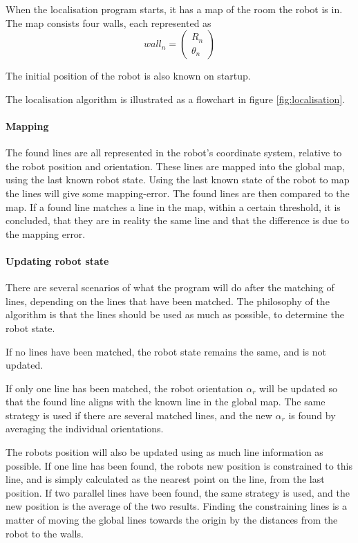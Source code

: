 When the localisation program starts, it has a map of the room the robot is in.
The map consists four walls, each represented as 
$$wall_n = \begin{pmatrix}
R_n\\
\theta_n
\end{pmatrix}
$$

The initial position of the robot is also known on startup.

The localisation algorithm is illustrated as a flowchart in figure \ref{fig:localisation}.

\paragraph*{Mapping}
The found lines are all represented in the robot's coordinate system, relative to the robot position and orientation.
These lines are mapped into the global map, using the last known robot state. Using 
the last known state of the robot to map the lines will give some mapping-error.
The found lines are then compared to the map. If a found line matches a line 
in the map, within a certain threshold, it is concluded, that they are in 
reality the same line and that the difference is due to the mapping error.

\paragraph*{Updating robot state}
There are several scenarios of what the program will do after the matching of lines,
depending on the lines that have been matched.
The philosophy of the algorithm is that the lines should be used as much as possible,
to determine the robot state.

If no lines have been matched, the robot state remains the same, and is not updated.

If only one line has been matched, the robot orientation \(\alpha_r\) will be updated
so that the found line aligns with the known line in the global map.
The same strategy is used if there are several matched lines, and the new \(\alpha_r\) is
found by averaging the individual orientations.

The robots position will also be updated using as much line information as possible.
If one line has been found, the robots new position is constrained to this line,
and is simply calculated as the nearest point on the line, from the last position.
If two parallel lines have been found, the same strategy is used, and the new position is the average of the two results.
Finding the constraining lines is a matter of moving the global lines towards the origin
by the distances from the robot to the walls.

